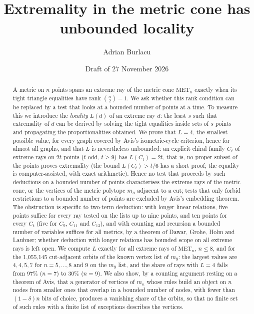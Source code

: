 \documentclass[11pt,a4paper]{article}
\title{Extremality in the metric cone has unbounded locality}
\author{Adrian Burlacu}
\date{Draft of 27 November 2026}
\theoremstyle{definition}
\theoremstyle{remark}
\newcommand{\MET}{\mathrm{MET}}
\begin{document}
\maketitle

\begin{abstract}
A metric on $n$ points spans an extreme ray of the metric cone $\MET_n$ exactly when its tight triangle equalities
have rank $\binom n2 - 1$. We ask whether this rank condition can be replaced by a test that looks at a bounded
number of points at a time. To measure this we introduce the \emph{locality} $L(d)$ of an extreme ray $d$: the least
$s$ such that extremality of $d$ can be derived by solving the tight equalities inside sets of $s$ points and
propagating the proportionalities obtained. We prove that $L = 4$, the smallest possible value, for every graph
covered by Avis's isometric-cycle criterion, hence for almost all graphs, and that $L$ is nevertheless unbounded: an
explicit chiral family $C_t$ of extreme rays on $2t$ points ($t$ odd, $t \ge 9$) has $L(C_t) = 2t$, that is, no
proper subset of the points proves extremality (the bound $L(C_t) > t/6$ has a short proof; the equality is
computer-assisted, with exact arithmetic). Hence no test that proceeds by such deductions on a bounded number of
points characterises the extreme rays of the metric cone, or the vertices of the metric polytope $m_n$ adjacent to a
cut; tests that only forbid restrictions to a bounded number of points are excluded by Avis's embedding theorem.
The obstruction is specific to two-term deduction: with longer linear relations, five points suffice for every
ray tested on the lists up to nine points, and ten points for every $C_t$ (five for $C_9$, $C_{11}$ and $C_{13}$), and with counting and recursion a bounded number of variables suffices for all metrics,
by a theorem of Dawar, Grohe, Holm and Laubner; whether deduction with longer relations has bounded scope on all
extreme rays is left open. We
compute $L$ exactly for all extreme
rays of $\MET_n$, $n \le 8$, and for the 1,055,145 cut-adjacent orbits of the known vertex list of $m_9$: the largest
values are $4, 4, 5, 7$ for $n = 5, \dots, 8$ and $9$ on the $m_9$ list, and the share of rays with $L = 4$ falls
from 97\% ($n = 7$) to 30\% ($n = 9$). We also show, by a counting argument resting on a theorem of Avis, that a
generator of vertices of $m_n$ whose rules build an object on $n$ nodes from smaller ones that overlap in a bounded
number of nodes, with fewer than $(1 - \delta)n$ bits of choice, produces a vanishing share of the orbits, so that no
finite set of such rules with a finite list of exceptions describes the vertices.
\end{abstract}
\end{document}
